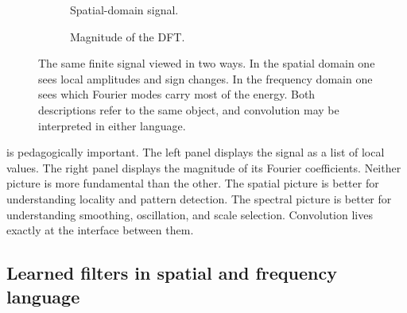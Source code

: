 \begin{figure}[t]
\centering
\begin{subfigure}[t]{0.48\textwidth}
\centering
{}
\caption{Spatial-domain signal.}
\end{subfigure}
\hfill
\begin{subfigure}[t]{0.48\textwidth}
\centering
{}
\caption{Magnitude of the DFT.}
\end{subfigure}
\caption{The same finite signal viewed in two ways.
In the spatial domain one sees local amplitudes and sign changes.
In the frequency domain one sees which Fourier modes carry most of the energy.
Both descriptions refer to the same object, and convolution may be interpreted in either language.}
\label{fig:spatial-frequency-view}
\end{figure}

\medskip

 is pedagogically important.
The left panel displays the signal as a list of local values.
The right panel displays the magnitude of its Fourier coefficients.
Neither picture is more fundamental than the other.
The spatial picture is better for understanding locality and pattern detection.
The spectral picture is better for understanding smoothing, oscillation, and scale selection.
Convolution lives exactly at the interface between them.

\subsection*{Learned filters in spatial and frequency language}

